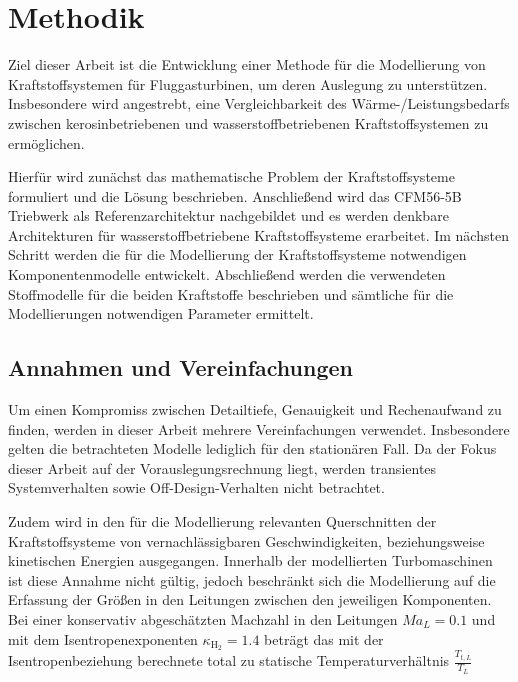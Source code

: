 \chapter{Methodik}
\label{chap:methodik}
Ziel dieser Arbeit ist die Entwicklung einer Methode für die Modellierung von Kraftstoffsystemen für Fluggasturbinen, um deren Auslegung zu unterstützen. Insbesondere wird angestrebt, eine Vergleichbarkeit des Wärme-/Leistungsbedarfs zwischen kerosinbetriebenen und wasserstoffbetriebenen Kraftstoffsystemen zu ermöglichen. 

Hierfür wird zunächst das mathematische Problem der Kraftstoffsysteme formuliert und die Lösung beschrieben. Anschließend wird  das CFM56-5B Triebwerk als Referenzarchitektur nachgebildet und es werden denkbare Architekturen für wasserstoffbetriebene Kraftstoffsysteme erarbeitet. Im nächsten Schritt werden die für die Modellierung der Kraftstoffsysteme notwendigen Komponentenmodelle entwickelt. Abschließend werden die verwendeten Stoffmodelle für die beiden Kraftstoffe beschrieben und sämtliche für die Modellierungen notwendigen Parameter ermittelt.

\section{Annahmen und Vereinfachungen}

Um einen Kompromiss zwischen Detailtiefe, Genauigkeit und Rechenaufwand zu finden, werden in dieser Arbeit mehrere Vereinfachungen verwendet. Insbesondere gelten die betrachteten Modelle lediglich für den stationären Fall. Da der Fokus dieser Arbeit auf der Vorauslegungsrechnung liegt, werden transientes Systemverhalten sowie Off-Design-Verhalten nicht betrachtet. 

Zudem wird in den für die Modellierung relevanten Querschnitten der Kraftstoffsysteme von vernachlässigbaren Geschwindigkeiten, beziehungsweise kinetischen Energien ausgegangen. Innerhalb der modellierten Turbomaschinen ist diese Annahme nicht gültig, jedoch beschränkt sich die Modellierung auf die Erfassung der Größen in den Leitungen zwischen den jeweiligen Komponenten. Bei einer konservativ abgeschätzten Machzahl in den Leitungen $Ma_L=0.1$ und mit dem Isentropenexponenten $\kappa_{\mathrm{H}_2} = 1.4$ beträgt das mit der Isentropenbeziehung berechnete total zu statische Temperaturverhältnis  $\frac{T_{t,L}}{T_L}$

